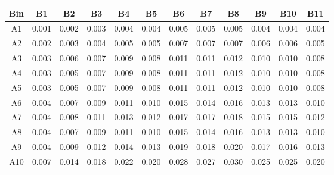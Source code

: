 \begin{tabular}{c@{~~~}c@{~~}c@{~~}c@{~~}c@{~~}c@{~~}c@{~~}c@{~~}c@{~~}c@{~~}c@{~~}c}
\hline 
 \hline 
Bin	& B1 & B2 & B3 & B4 & B5 & B6 & B7 & B8 & B9 & B10 & B11 \\ 
\hline 
A1	&  0.001 &  0.002 &  0.003 &  0.004 &  0.004 &  0.005 &  0.005 &  0.005 &  0.004 &  0.004 &  0.004 \\  
A2	&  0.002 &  0.003 &  0.004 &  0.005 &  0.005 &  0.007 &  0.007 &  0.007 &  0.006 &  0.006 &  0.005 \\  
A3	&  0.003 &  0.006 &  0.007 &  0.009 &  0.008 &  0.011 &  0.011 &  0.012 &  0.010 &  0.010 &  0.008 \\  
A4	&  0.003 &  0.005 &  0.007 &  0.009 &  0.008 &  0.011 &  0.011 &  0.012 &  0.010 &  0.010 &  0.008 \\  
A5	&  0.003 &  0.005 &  0.007 &  0.009 &  0.008 &  0.011 &  0.011 &  0.012 &  0.010 &  0.010 &  0.008 \\  
A6	&  0.004 &  0.007 &  0.009 &  0.011 &  0.010 &  0.015 &  0.014 &  0.016 &  0.013 &  0.013 &  0.010 \\  
A7	&  0.004 &  0.008 &  0.011 &  0.013 &  0.012 &  0.017 &  0.017 &  0.018 &  0.015 &  0.015 &  0.012 \\  
A8	&  0.004 &  0.007 &  0.009 &  0.011 &  0.010 &  0.015 &  0.014 &  0.016 &  0.013 &  0.013 &  0.010 \\  
A9	&  0.004 &  0.009 &  0.012 &  0.014 &  0.013 &  0.019 &  0.018 &  0.020 &  0.017 &  0.016 &  0.013 \\  
A10	&  0.007 &  0.014 &  0.018 &  0.022 &  0.020 &  0.028 &  0.027 &  0.030 &  0.025 &  0.025 &  0.020 \\  
\hline 
 \hline 
\end{tabular}